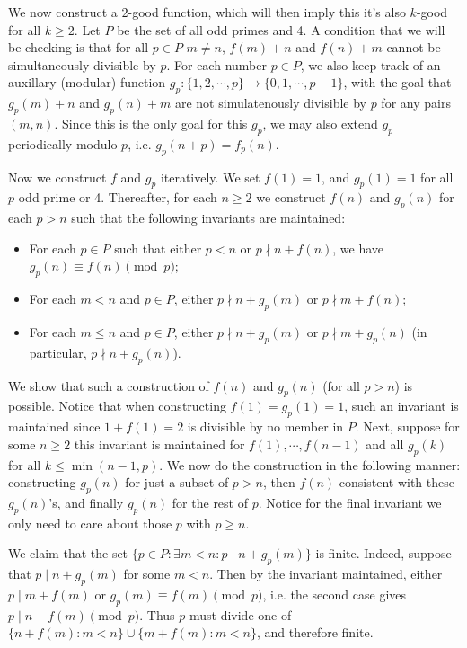 \documentclass[11pt,a4paper]{article}
\begin{document}
\begin{enumerate}
We now construct a $2$-good function, which will then imply this it's also $k$-good for all $k\ge 2$. 
Let $P$ be the set of all odd primes and 4. 
A condition that we will be checking is that for all $p\in P$ $m\neq n$, $f(m) + n$ and $f(n) + m$ cannot be simultaneously divisible by $p$. 
For each number $p\in P$, we also keep track of an auxillary (modular) function $g_p: \{1, 2,\cdots, p\}\to \{0, 1, \cdots, p - 1\}$, with the goal that $g_p(m) + n$ and $g_p(n) + m$ are not simulatenously divisible by $p$ for any pairs $(m, n)$. 
Since this is the only goal for this $g_p$, we may also extend $g_p$ periodically modulo $p$, i.e. $g_p(n + p)=f_p(n)$. 

Now we construct $f$ and $g_p$ iteratively. We set $f(1) = 1$, and $g_p(1)=1$ for all $p$ odd prime or 4. 
Thereafter, for each $n\ge 2$ we construct $f(n)$ and $g_p(n)$ for each $p > n$ such that the following invariants are maintained: 
\begin{itemize}
	\item For each $p\in P$ such that either $p < n$ or $p\nmid n + f(n)$, we have $g_p(n)\equiv f(n)\pmod{p}$; 
	
	\item For each $m < n$ and $p\in P$, either $p\nmid n + g_p(m)$ or $p\nmid m + f(n)$; 
	
	\item For each $m\le n$ and $p\in P$, either $p\nmid n + g_p(m)$ or $p\nmid m + g_p(n)$ (in particular, $p\nmid n + g_p(n)$). 
\end{itemize}
We show that such a construction of $f(n)$ and $g_p(n)$ (for all $p > n$) is possible. 
Notice that when constructing $f(1)=g_p(1)=1$, such an invariant is maintained since $1 + f(1)=2$ is divisible by no member in $P$. 
Next, suppose for some $n\ge 2$ this invariant is maintained for $f(1), \cdots, f(n - 1)$ and all $g_p(k)$ for all $k\le \min(n - 1, p)$.
We now do the construction in the following manner: 
constructing $g_p(n)$ for just a subset of $p > n$, then $f(n)$ consistent with these $g_p(n)$'s, and finally $g_p(n)$ for the rest of $p$. 
Notice for the final invariant we only need to care about those $p$ with $p\ge n$. 

We claim that the set $\{p\in P: \exists m < n: p\mid n + g_p(m)\}$ is finite. 
Indeed, suppose that $p\mid n + g_p(m)$ for some $m < n$. 
Then by the invariant maintained, either $p\mid m + f(m)$ or $g_p(m)\equiv f(m)\pmod{p}$, i.e. the second case gives $p \mid n + f(m)\pmod{p}$. 
Thus $p$ must divide one of $\{n + f(m): m < n\}\cup \{m + f(m): m < n\}$, and therefore finite. 


\end{enumerate}
\end{document}
